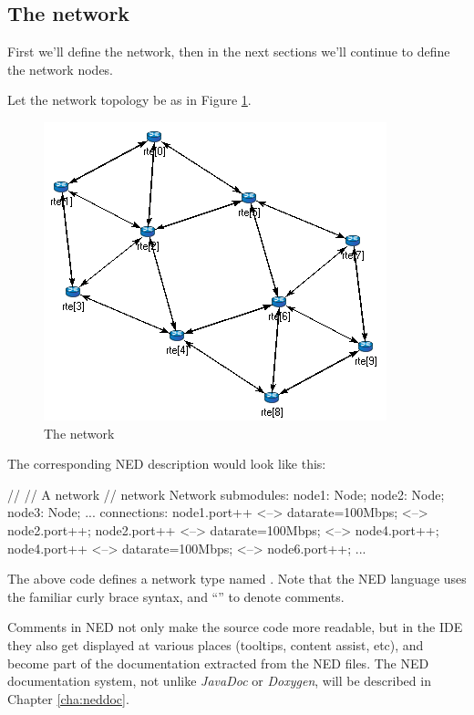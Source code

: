 \subsection{The network}
\label{sec:ch-ned-lang:warmup:network}

First we'll define the network, then in the next sections we'll continue
to define the network nodes.

Let the network topology be as in Figure \ref{fig:ned-routing-topology}.

\begin{figure}[htbp]
  \centering
  \includegraphics[scale=0.6]{figures/ned-routing-network}
  \caption{The network}
  \label{fig:ned-routing-topology}
\end{figure}

The corresponding NED description would look like this:

\begin{ned}
//
// A network
//
network Network
{
    submodules:
        node1: Node;
        node2: Node;
        node3: Node;
        ...
    connections:
        node1.port++ <--> {datarate=100Mbps;} <--> node2.port++;
        node2.port++ <--> {datarate=100Mbps;} <--> node4.port++;
        node4.port++ <--> {datarate=100Mbps;} <--> node6.port++;
        ...
}
\end{ned}

The above code defines a network type named . Note that the NED
language uses the familiar curly brace syntax, and ``\ttt{//}'' to denote
comments.

\begin{note}
    Comments in NED not only make the source code more readable, but in the
    {\opp} IDE they also get displayed at various places (tooltips, content
    assist, etc), and become part of the documentation extracted from the NED
    files. The NED documentation system, not unlike \textit{JavaDoc} or
    \textit{Doxygen}, will be described in Chapter \ref{cha:neddoc}.
\end{note}

